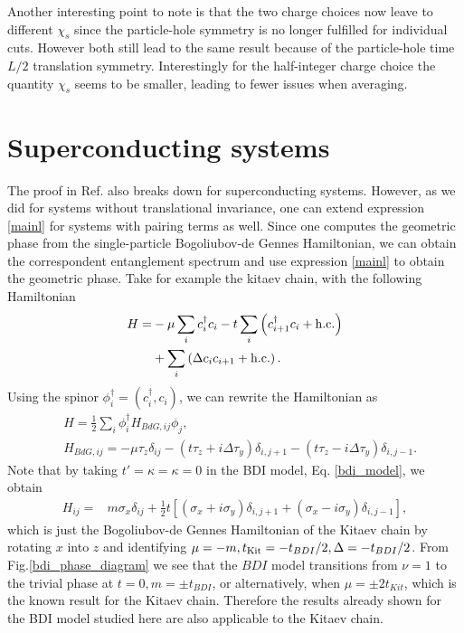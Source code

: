 \documentclass[twocolumn,amsmath,longbibliography,amssymb,superscriptaddress]{revtex4-1}
\begin{document}
Another interesting point to note is that the two charge choices now leave to different $\chi_s$ since the particle-hole symmetry is no longer fulfilled for individual cuts. However both still lead to the same result because of the particle-hole time $L/2$ translation symmetry. Interestingly for the half-integer charge choice the quantity $\chi_s$ seems to be smaller, leading to fewer issues when averaging. 





\section{Superconducting systems}

The proof in Ref.\cite{Zaletel2014} also breaks down for superconducting systems. However, as we did for systems without translational invariance, one can extend expression \ref{mainl} for systems with pairing terms as well. Since one computes the geometric phase from the single-particle Bogoliubov-de Gennes Hamiltonian, we can obtain the correspondent entanglement spectrum and use expression \ref{mainl} to obtain the geometric phase. Take for example the kitaev chain, with the following Hamiltonian
\begin{align*}
H =& -\mu \sum_{i} c_i^\dagger c_i - t \sum_{i}\left( c_{i+1}^\dagger c_i + {\rm h.c.}\right) \\
&+  \sum_{i}\left( \Delta c_{i} c_{i+1} + {\rm h.c.}\right).
\end{align*}
Using the spinor $\phi_i^\dagger = (c_i^\dagger, c_i)$, we can rewrite the Hamiltonian as
\begin{align*}
&H = \frac{1}{2}\sum_i \phi^\dagger_i H_{BdG,ij} \phi_j,\\
&H_{BdG,ij} = -\mu \tau_z \delta_{ij} - (t \tau_z + i\Delta \tau_y )\delta_{i,j+1}- (t \tau_z - i\Delta \tau_y)\delta_{i,j-1}.
\end{align*}
Note that by taking $t' = \kappa = \kappa = 0$ in the BDI model, Eq. \ref{bdi_model}, we obtain
\begin{align*}
H_{ij} =& m \sigma_x\delta_{ij} + \frac{1}{2} t \left[(\sigma_x + i \sigma_y)\delta_{i,j+1} + (\sigma_x - i \sigma_y) \delta_{i,j-1} \right],
\end{align*}
which is just the Bogoliubov-de Gennes Hamiltonian of the Kitaev chain by rotating $x$ into $z$ and identifying $\mu = -m, t_{\rm Kit} = -t_{BDI}/2, \Delta = -t_{BDI}/2 $. From Fig.\ref{bdi_phase_diagram} we see that the $BDI$ model transitions from $\nu = 1$ to the trivial phase at $t=0, m=\pm t_{BDI}$, or alternatively, when $\mu = \pm 2 t_{Kit}$, which is the known result for the Kitaev chain. Therefore the results already shown for the BDI model studied here are also applicable to the Kitaev chain.  
\end{document}
